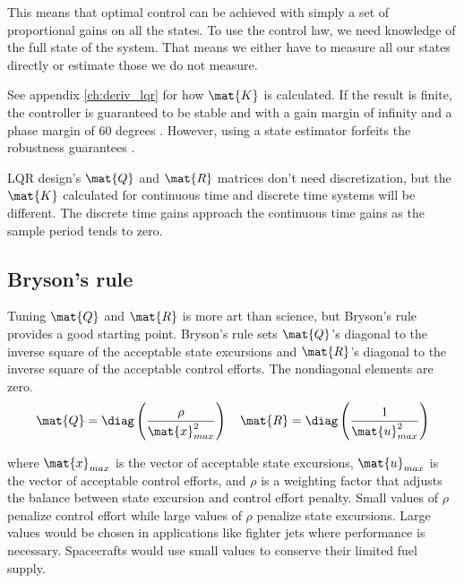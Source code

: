 This means that optimal control can be achieved with simply a set of
proportional gains on all the \glspl{state}. To use the \gls{control law}, we
need knowledge of the full \gls{state} of the \gls{system}. That means we either
have to measure all our \glspl{state} directly or estimate those we do not
measure.

See appendix \ref{ch:deriv_lqr} for how $\mat{K}$ is calculated. If the result
is finite, the controller is guaranteed to be stable and
 with a \gls{gain margin} of infinity and a
\gls{phase margin} of 60 degrees \cite{bib:lqr_phase_margin}. However, using a
state estimator forfeits the robustness guarantees
\cite{bib:lqg_guaranteed_margins}.
\begin{remark}
  LQR design's $\mat{Q}$ and $\mat{R}$ matrices don't need \gls{discretization},
  but the $\mat{K}$ calculated for continuous time and discrete time
  \glspl{system} will be different. The discrete time gains approach the
  continuous time gains as the sample period tends to zero.
\end{remark}

\subsection{Bryson's rule}

Tuning $\mat{Q}$ and $\mat{R}$ is more art than science, but Bryson's rule
\cite{bib:applied_optimal_control} provides a good starting point. Bryson's rule
sets $\mat{Q}$'s diagonal to the inverse square of the acceptable state
excursions and $\mat{R}$'s diagonal to the inverse square of the acceptable
control efforts. The nondiagonal elements are zero.
\begin{equation*}
  \mat{Q} = \diag\left(\frac{\rho}{\mat{x}_{max}^2}\right)
  \quad
  \mat{R} = \diag\left(\frac{1}{\mat{u}_{max}^2}\right)
\end{equation*}

where $\mat{x}_{max}$ is the vector of acceptable state excursions,
$\mat{u}_{max}$ is the vector of acceptable control efforts, and $\rho$ is a
weighting factor that adjusts the balance between state excursion and control
effort penalty. Small values of $\rho$ penalize \gls{control effort} while large
values of $\rho$ penalize \gls{state} excursions. Large values would be chosen
in applications like fighter jets where performance is necessary. Spacecrafts
would use small values to conserve their limited fuel supply.

